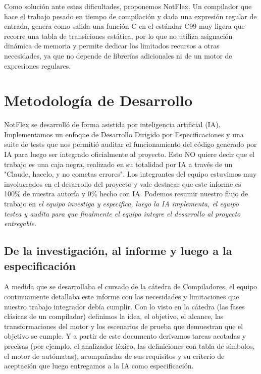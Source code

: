 \documentclass[runningheads]{llncs}
\begin{document}
Como solución ante estas dificultades, proponemos NotFlex. Un compilador que hace el trabajo pesado en tiempo de compilación y dada una expresión regular de entrada, genera como salida una función C en el estándar C99 muy ligera que recorre una tabla de transiciones estática, por lo que no utiliza asignación dinámica de memoria y permite dedicar los limitados recursos a otras necesidades, ya que no depende de librerías adicionales ni de un motor de expresiones regulares.

\section{Metodología de Desarrollo}\label{sec:metodologia}

NotFlex se desarrolló de forma asistida por inteligencia artificial (IA). Implementamos un enfoque de Desarrollo Dirigido por Especificaciones y una suite de tests que nos permitió auditar el funcionamiento del código generado por IA para luego ser integrado oficialmente al proyecto. Esto NO quiere decir que el trabajo es una caja negra, realizado en su totalidad por IA a través de un "Claude, hacelo, y no cometas errores". Los integrantes del equipo estuvimos muy involucrados en el desarrollo del proyecto y vale destacar que este informe es 100\% de nuestra autoría y 0\% hecho con IA. 
Podemos resumir nuestro flujo de trabajo en \emph{el equipo investiga y especifica, luego la IA implementa, el equipo testea y audita para que finalmente el equipo integre el desarrollo al proyecto entregable}.

\subsection{De la investigación, al informe y luego a la especificación}

A medida que se desarrollaba el cursado de la cátedra de Compiladores, el equipo continuamente detallaba este informe con las necesidades y limitaciones que nuestro trabajo integrador debía cumplir. Con lo visto en la cátedra (las fases
clásicas de un compilador) definimos la idea, el objetivo, el
alcance, las transformaciones del motor y los escenarios de prueba que
demuestran que el objetivo se cumple. Y a partir de este documento derivamos tareas acotadas y precisas (por ejemplo, el analizador léxico, las definiciones con
tabla de símbolos, el motor de autómatas), acompañadas de sus requisitos y
su criterio de aceptación que luego entregamos a la IA como especificación.
\end{document}
